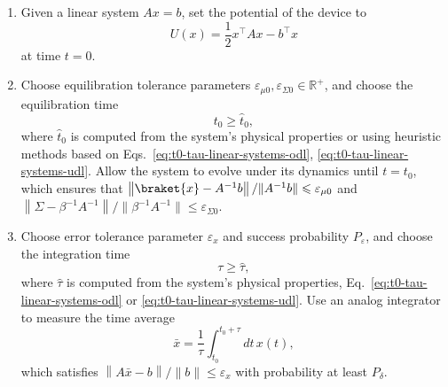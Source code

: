\documentclass[prx,onecolumn,floatfix,longbibliography,notitlepage, nofootinbib,12pt]{revtex4-2}
\renewcommand{\geq}{\geqslant}
\renewcommand{\leq}{\leqslant}
\begin{document}
\medskip
\begin{tcolorbox}[title={Linear System Protocol}, breakable]
\begin{enumerate}
\item Given a linear system $A x = b$, set the potential of the device to
\begin{equation}
    U(x) = \frac{1}{2} x^\intercal A x - b^\intercal x
\end{equation}
at time $t=0$.
\item Choose equilibration tolerance parameters $\varepsilon_{\mu0}, \varepsilon_{\Sigma 0} \in \mathbb{R}^+$, and choose the equilibration time
\begin{equation}
\label{eq:UDL-eq-time}
t_0 \geq \widehat{t}_0,
\end{equation}
where $\widehat{t}_0$ is computed from the system's physical properties or using heuristic methods based on Eqs.~\eqref{eq:t0-tau-linear-systems-odl}, \eqref{eq:t0-tau-linear-systems-udl}. Allow the system to evolve under its dynamics until $t=t_0$, which ensures that $\left\|\braket{x} - A^{-1} b\right\|/\|A^{-1} b\| \leq \varepsilon_{\mu 0}$ and $\left\|\Sigma - \beta^{-1} A^{-1} \right\|/\|\beta^{-1}A^{-1}\| \leq \varepsilon_{\Sigma0}$.
\item Choose error tolerance parameter $\varepsilon_x$ and success probability $P_\varepsilon$, and choose the integration time
\begin{equation}
    \tau \geq \widehat{\tau},
\end{equation}
where $\widehat{\tau}$ is computed from the system's physical properties, Eq.~\eqref{eq:t0-tau-linear-systems-odl} or \eqref{eq:t0-tau-linear-systems-udl}. Use an analog integrator to measure the time average
\begin{equation}
    \bar{x} = \frac{1}{\tau} \int_{t_0}^{t_0 + \tau} dt\, x(t),
\end{equation}
which satisfies $\left\|A \bar{x} - b\right\|/\|b\| \leq \varepsilon_x$ with probability at least $P_\delta$.
\end{enumerate}
\end{tcolorbox}
\medskip
\end{document}
